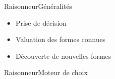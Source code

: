 \begin{frame}{Raisonneur}{Généralités}
	\begin{itemize}
		\item Prise de décision
		\item Valuation des formes connues
		\item Découverte de nouvelles formes
	\end{itemize}
\end{frame}

\begin{frame}{Raisonneur}{Moteur de choix}
	\begin{minipage}{0.45\textwidth}
\end{minipage}
\end{frame}

